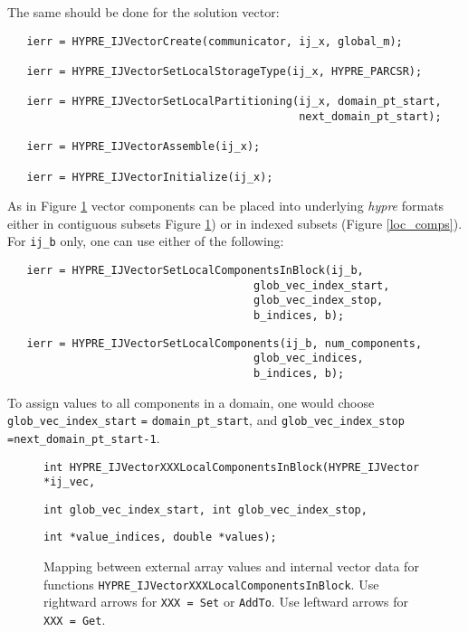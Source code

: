 \noindent The same should be done for the solution vector:

\begin{verbatim}
   ierr = HYPRE_IJVectorCreate(communicator, ij_x, global_m);

   ierr = HYPRE_IJVectorSetLocalStorageType(ij_x, HYPRE_PARCSR);

   ierr = HYPRE_IJVectorSetLocalPartitioning(ij_x, domain_pt_start,
                                             next_domain_pt_start);

   ierr = HYPRE_IJVectorAssemble(ij_x);

   ierr = HYPRE_IJVectorInitialize(ij_x);
\end{verbatim}

\noindent As in Figure \ref{loc_comps_blk} vector components
can be placed into underlying {\slshape hypre} formats either
in contiguous subsets Figure \ref{loc_comps_blk}) or in
indexed subsets (Figure \ref{loc_comps}). For \verb+ij_b+ only,
one can use either of the following:

\begin{verbatim}
   ierr = HYPRE_IJVectorSetLocalComponentsInBlock(ij_b,
                                      glob_vec_index_start,
                                      glob_vec_index_stop,
                                      b_indices, b);
\end{verbatim}
\begin{verbatim}
   ierr = HYPRE_IJVectorSetLocalComponents(ij_b, num_components,
                                      glob_vec_indices,
                                      b_indices, b);
\end{verbatim}

\noindent To assign values to all components in a domain, one would
choose \verb+glob_vec_index_start+ \verb+=+ \verb+domain_pt_start+,
and \verb+glob_vec_index_stop+ \verb+=+\verb+next_domain_pt_start-1+.

\begin{figure}
\label{loc_comps_blk}
\centerline{}
\parbox{6.5in}{\hspace{1in}
  {\tt int HYPRE\_IJVectorXXXLocalComponentsInBlock(HYPRE\_IJVector *ij\_vec,}}
\parbox{6.5in}{\hspace{2in}
  {\tt int glob\_vec\_index\_start, int glob\_vec\_index\_stop,}}
\parbox{6.5in}{\hspace{2in}
  {\tt int *value\_indices, double *values);}}
\caption{Mapping between external array values and
  internal vector data for functions
  {\tt HYPRE\_IJVectorXXX}{\tt LocalComponentsInBlock}.
   Use rightward arrows for {\tt XXX = Set} or {\tt AddTo}.
   Use leftward arrows for {\tt XXX = Get}.}
\end{figure}


